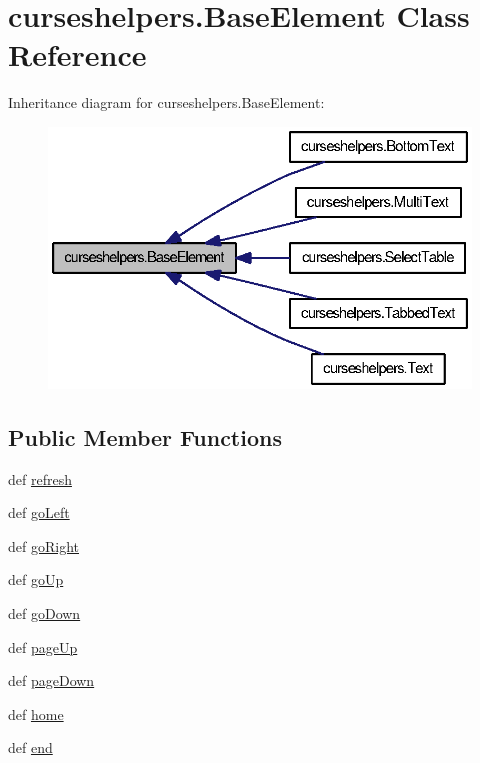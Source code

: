 \section{curseshelpers.\-Base\-Element Class Reference}
\label{classcurseshelpers_1_1BaseElement}


Inheritance diagram for curseshelpers.\-Base\-Element\-:
\nopagebreak
\begin{figure}[H]
\begin{center}
\leavevmode
\includegraphics[width=328pt]{classcurseshelpers_1_1BaseElement__inherit__graph}
\end{center}
\end{figure}
\subsection*{Public Member Functions}
\begin{DoxyCompactItemize}
\item 
def \hyperlink{classcurseshelpers_1_1BaseElement_ae6ceda9ac1ed6d48cb304aa8de2a94b1}{refresh}
\item 
def \hyperlink{classcurseshelpers_1_1BaseElement_a8dad4b03794798c7b6de02554312859f}{go\-Left}
\item 
def \hyperlink{classcurseshelpers_1_1BaseElement_aac34d4e8081c795ff91dd124a997cf2a}{go\-Right}
\item 
def \hyperlink{classcurseshelpers_1_1BaseElement_a47e7464786cfdd6385fe505ee2772c16}{go\-Up}
\item 
def \hyperlink{classcurseshelpers_1_1BaseElement_aae5772912da5ae17cf36974d2bf60666}{go\-Down}
\item 
def \hyperlink{classcurseshelpers_1_1BaseElement_aaebbd0ee80116ea05a5cadaafd57bb69}{page\-Up}
\item 
def \hyperlink{classcurseshelpers_1_1BaseElement_aef505ea0e4fc4250fe449dd861ed6160}{page\-Down}
\item 
def \hyperlink{classcurseshelpers_1_1BaseElement_ad3a96d465acebec374d19b830aade6c9}{home}
\item 
def \hyperlink{classcurseshelpers_1_1BaseElement_a1598dce258dc2f0421dafa5846c7bd88}{end}
\end{DoxyCompactItemize}


